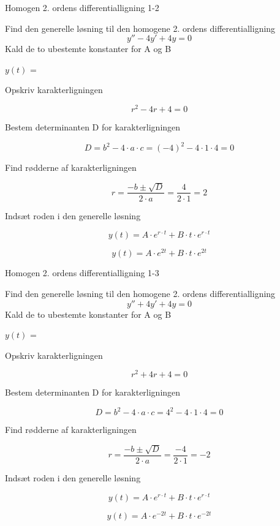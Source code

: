 \documentclass{article}
\begin{document}
\begin{exercise}{Homogen 2. ordens differentialligning 1-2}

Find den generelle løsning til den homogene 2. ordens differentialligning
\[
y'' - 4y' + 4y = 0
\]
Kald de to ubestemte konstanter for A og B

$y(t)$ = 


\hint

Opskriv karakterligningen

\hint

\[
r^2 - 4r + 4 = 0
\]


\hint

Bestem determinanten D for karakterligningen


\hint
\[
D = b^2 - 4 \cdot a \cdot c = (-4)^2 - 4 \cdot 1 \cdot 4 = 0
\]

\hint
Find rødderne af karakterligningen


\hint

\[
r = \frac{-b \pm \sqrt{D}}{2 \cdot a} = \frac{4}{2 \cdot 1} = 2
\]

\hint

Indsæt roden i den generelle løsning

\hint
\[
y(t) = A \cdot e^{r \cdot t} + B \cdot t \cdot e^{r \cdot t}
\]

\hint

\[
y(t) = A \cdot e^{2t} + B \cdot t \cdot e^{2t}
\]


\end{exercise}

\newpage

\begin{exercise}{Homogen 2. ordens differentialligning 1-3}

Find den generelle løsning til den homogene 2. ordens differentialligning
\[
y'' + 4y' + 4y = 0
\]
Kald de to ubestemte konstanter for A og B

$y(t)$ = 


\hint

Opskriv karakterligningen

\hint

\[
r^2 + 4r + 4 = 0
\]


\hint

Bestem determinanten D for karakterligningen


\hint
\[
D = b^2 - 4 \cdot a \cdot c = 4^2 - 4 \cdot 1 \cdot 4 = 0
\]

\hint
Find rødderne af karakterligningen


\hint

\[
r = \frac{-b \pm \sqrt{D}}{2 \cdot a} = \frac{-4}{2 \cdot 1} = -2
\]

\hint

Indsæt roden i den generelle løsning

\hint
\[
y(t) = A \cdot e^{r \cdot t} + B \cdot t \cdot e^{r\cdot t}
\]

\hint

\[
y(t) = A \cdot e^{-2t} + B \cdot t \cdot e^{-2t}
\]


\end{exercise}
\end{document}
